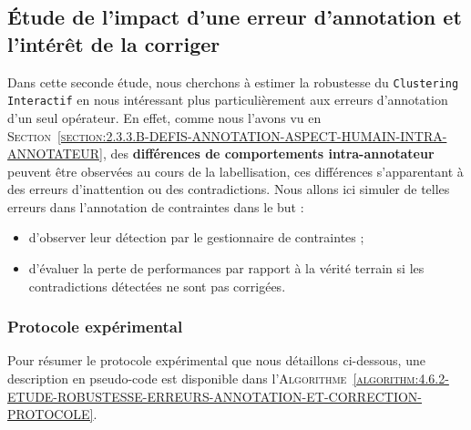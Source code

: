 	
	\subsection{Étude de l'impact d'une erreur d'annotation et l'intérêt de la corriger}
	\label{section:4.6.2-ETUDE-ROBUSTESSE-ERREURS-ANNOTATION-ET-CORRECTION}
		
		Dans cette seconde étude, nous cherchons à estimer la robustesse du \texttt{Clustering Interactif} en nous intéressant plus particulièrement aux erreurs d'annotation d'un seul opérateur.
		En effet, comme nous l'avons vu en \textsc{Section~\ref{section:2.3.3.B-DEFIS-ANNOTATION-ASPECT-HUMAIN-INTRA-ANNOTATEUR}}, des \textbf{différences de comportements intra-annotateur} peuvent être observées au cours de la labellisation, ces différences s'apparentant à des erreurs d'inattention ou des contradictions.
		Nous allons ici simuler de telles erreurs dans l'annotation de contraintes dans le but :
		\begin{itemize}
			\item d'observer leur détection par le gestionnaire de contraintes ;
			\item d'évaluer la perte de performances par rapport à la vérité terrain si les contradictions détectées ne sont pas corrigées.
		\end{itemize}
	
		\subsubsection{Protocole expérimental}
			
			Pour résumer le protocole expérimental que nous détaillons ci-dessous, une description en pseudo-code est disponible dans l'\textsc{Algorithme~\ref{algorithm:4.6.2-ETUDE-ROBUSTESSE-ERREURS-ANNOTATION-ET-CORRECTION-PROTOCOLE}}.
			
